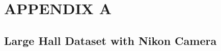 \documentclass[11pt]{report}
\begin{document}
\section*{APPENDIX A}
\subsection{Large Hall Dataset with Nikon Camera}
\label{sec:nikonlargeHall}
%
%
%
\end{document}
